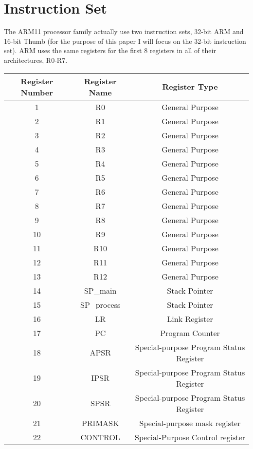 \documentclass[twoside]{article}
\begin{document}
	\pagebreak
	
	\section{Instruction Set}
	
	The ARM11 processor family actually use two instruction sets, 32-bit ARM and 16-bit Thumb (for the purpose of this paper I will focus on the 32-bit instruction set). ARM uses the same registers for the first 8 registers in all of their architectures, R0-R7.
	
	\begin{center}
		\begin{tabular}{ c c c}
			Register Number & Register Name & Register Type \\
			\hline
			1     	        & R0       		&  General Purpose  \\
			2               & R1       &  General Purpose  \\
			3               & R2       &  General Purpose  \\
			4               & R3       &  General Purpose  \\
			5               & R4       &  General Purpose  \\
			6               & R5       &  General Purpose  \\
			7               & R6       &  General Purpose  \\
			8               & R7       &  General Purpose  \\
			9               & R8       &  General Purpose  \\
			10              & R9       &  General Purpose  \\
			11              & R10      &  General Purpose  \\
			12              & R11      &  General Purpose  \\
			13              & R12      &  General Purpose  \\
			14              & SP\_main  &  Stack Pointer    \\
			15              & SP\_process &  Stack Pointer  \\
			16              & LR       & Link Register     \\
			17              & PC       & Program Counter   \\
			18              & APSR     & Special-purpose Program Status Register    \\
			19              & IPSR     & Special-purpose Program Status Register  \\
			20              & SPSR     & Special-purpose Program Status Register    \\
			21              & PRIMASK  & Special-purpose mask register   \\
			22              & CONTROL  & Special-Purpose Control register    \\
			
		\end{tabular}
	\end{center}
	
\end{document}
